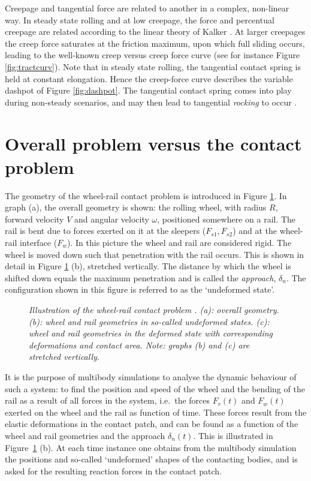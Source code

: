 \documentclass[12pt]{report}
\begin{document}
Creepage and tangential force are related to another in a complex,
non-linear way. In steady state rolling and at low creepage, the force and
percentual creepage are related according to the linear theory of Kalker
\cite{Kalker1967,Kalker1990}. At larger creepages the creep force saturates
at the friction maximum, upon which full sliding occurs, leading to the
well-known creep versus creep force curve (see for instance Figure
\ref{fig:tractcurv}). Note that in steady state rolling, the tangential
contact spring is held at constant elongation.  Hence the creep-force curve
describes the variable dashpot of Figure \ref{fig:dashpot}. The tangential
contact spring comes into play during non-steady scenarios, and may then
lead to tangential {\em rocking\/} to occur \cite{Vollebregt2015b-iavsd2015,
Vollebregt2017a-iavsd2017}.

\section{Overall problem versus the contact problem}

The geometry of the wheel-rail contact problem is introduced in Figure
\ref{fig:bent_rail}. In graph (a), the overall geometry is shown: the
rolling wheel, with radius $R$, forward velocity $V$ and angular velocity
$\omega$, positioned somewhere on a rail. The rail is bent due to forces
exerted on it at the sleepers ($F_{s1}, F_{s2}$) and at the wheel-rail
interface ($F_w$). In this picture the wheel and rail are considered rigid.
The wheel is moved down such that penetration with the rail occurs. This is
shown in detail in Figure \ref{fig:bent_rail} (b), stretched vertically.
The distance by which the wheel is shifted down equals the maximum
penetration and is called the {\em approach\/}, $\delta_n$. The configuration
shown in this figure is referred to as the `undeformed state'.

\begin{figure}[bt]
\centering
{}
\caption{\em Illustration of the wheel-rail contact problem 
\cite{Vollebregt2012a-quasistd}. (a): overall geometry. (b): wheel and rail
geometries in so-called undeformed states. (c): wheel and rail geometries
in the deformed state with corresponding deformations and contact area.
Note: graphs (b) and (c) are stretched vertically.}
\label{fig:bent_rail}
\end{figure}

It is the purpose of multibody simulations to analyse the dynamic behaviour
of such a system: to find the position and speed of the wheel and the bending
of the rail as a result of all forces in the system, i.e.\
the forces $F_r(t)$ and $F_w(t)$ exerted on the wheel and the rail as
function of time. These forces result from the elastic deformations in the
contact patch, and can be found as a function of the wheel and rail
geometries and the approach $\delta_n(t)$. This is illustrated in
Figure~\ref{fig:bent_rail} (b). At each time instance one obtains from the
multibody simulation the positions and so-called `undeformed' shapes of
the contacting bodies, and is asked for the resulting reaction forces in
the contact patch.
\end{document}
